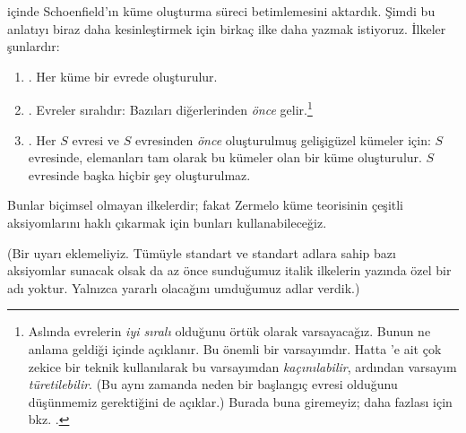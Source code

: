 \documentclass[../../../include/open-logic-section]{subfiles}
\begin{document}

 içinde Schoenfield'ın küme oluşturma süreci
betimlemesini aktardık. Şimdi bu anlatıyı biraz daha kesinleştirmek için
birkaç ilke daha yazmak istiyoruz. İlkeler şunlardır:
\begin{enumerate}
\item[] \stageshier. Her küme bir evrede oluşturulur.
\item[] \stagesord. Evreler sıralıdır: Bazıları diğerlerinden \emph{önce}
gelir.\footnote{Aslında evrelerin \emph{iyi sıralı} olduğunu örtük olarak
varsayacağız. Bunun ne anlama geldiği  içinde
açıklanır. Bu önemli bir varsayımdır. Hatta \citet{Scott1974}'e ait çok
zekice bir teknik kullanılarak bu varsayımdan \emph{kaçınılabilir}, ardından
varsayım \emph{türetilebilir}. (Bu aynı zamanda neden bir başlangıç evresi
olduğunu düşünmemiz gerektiğini de açıklar.) Burada buna giremeyiz; daha
fazlası için bkz. \citet{ButtonLT1}.}
\item[] \stagesacc. Her $S$ evresi ve $S$ evresinden \emph{önce}
oluşturulmuş gelişigüzel kümeler için: $S$ evresinde, elemanları tam olarak
bu kümeler olan bir küme oluşturulur. $S$ evresinde başka hiçbir şey
oluşturulmaz.
\end{enumerate}
Bunlar biçimsel olmayan ilkelerdir; fakat Zermelo küme teorisinin çeşitli
aksiyomlarını haklı çıkarmak için bunları kullanabileceğiz.

(Bir uyarı eklemeliyiz. Tümüyle standart ve standart adlara sahip bazı
aksiyomlar sunacak olsak da az önce sunduğumuz italik ilkelerin yazında özel
bir adı yoktur. Yalnızca yararlı olacağını umduğumuz adlar verdik.)
\end{document}
